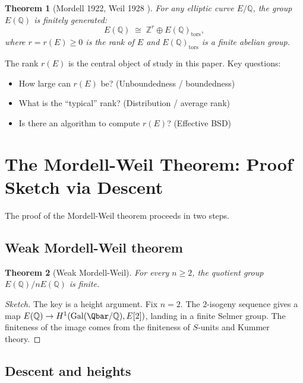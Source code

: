 \documentclass[12pt,a4paper]{amsart}
\newtheorem{theorem}{Theorem}[section]
\theoremstyle{definition}
\theoremstyle{remark}
\newcommand{\Z}{\mathbb{Z}}
\newcommand{\Q}{\mathbb{Q}}
\newcommand{\Gal}{\mathrm{Gal}}
\begin{document}
\begin{theorem}[Mordell 1922, Weil 1928 \cite{Mordell1922,Weil1928}]
  For any elliptic curve $E/\Q$, the group $E(\Q)$ is finitely generated:
  \[
    E(\Q) \;\cong\; \Z^r \oplus E(\Q)_{\mathrm{tors}},
  \]
  where $r = r(E) \geq 0$ is the \emph{rank} of $E$ and $E(\Q)_{\mathrm{tors}}$ is a
  finite abelian group.
\end{theorem}

The rank $r(E)$ is the central object of study in this paper. Key questions:
\begin{itemize}
  \item How large can $r(E)$ be? (Unboundedness / boundedness)
  \item What is the ``typical'' rank? (Distribution / average rank)
  \item Is there an algorithm to compute $r(E)$? (Effective BSD)
\end{itemize}

\section{The Mordell-Weil Theorem: Proof Sketch via Descent}\label{sec:mordell_weil}

The proof of the Mordell-Weil theorem proceeds in two steps.

\subsection{Weak Mordell-Weil theorem}

\begin{theorem}[Weak Mordell-Weil]
  For every $n \geq 2$, the quotient group $E(\Q)/nE(\Q)$ is finite.
\end{theorem}

\begin{proof}[Sketch]
  The key is a height argument. Fix $n=2$. The $2$-isogeny sequence gives a map
  $E(\Q) \to H^1(\Gal(\Qbar/\Q), E[2])$, landing in a finite Selmer group.
  The finiteness of the image comes from the finiteness of $S$-units and Kummer theory.
\end{proof}

\subsection{Descent and heights}
\end{document}
